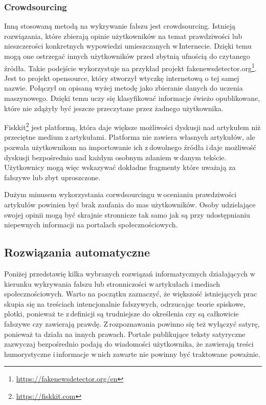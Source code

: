 \subsubsection{Crowdsourcing}
Inną stosowaną metodą na wykrywanie fałszu jest crowdsourcing. Istnieją rozwiązania, które zbierają opinie użytkowników na temat prawdziwości lub nieszczerości konkretnych wypowiedzi umieszczanych w\,Internecie. Dzięki temu mogą one ostrzegać innych użytkowników przed zbytnią ufnością do czytanego źródła. Takie podejście wykorzystuje na przykład projekt fakenewsdetector.org\footnote{\url{https://fakenewsdetector.org/en}}. Jest to projekt opensource, który stworzył wtyczkę internetową o tej samej nazwie. Połączył on opisaną wyżej metodę jako zbieranie danych do uczenia maszynowego. Dzięki temu uczy się klasyfikować informacje świeżo opublikowane, które nie zdążyły być jeszcze przeczytane przez żadnego użytkownika. 
\par Fiskkit\footnote{\url{https://fiskkit.com}} jest platformą, która daje większe możliwości dyskusji nad artykułem niż przeciętne medium z\,artykułami. Platforma nie zawiera własnych artykułów, ale pozwala użytkownikom na importowanie ich z\,dowolnego źródła i\,daje możliwość dyskusji bezpośrednio nad każdym osobnym zdaniem w\,danym tekście. Użytkownicy mogą więc wskazywać dokładne fragmenty które uważają za fałszywe lub zbyt uproszczone.
\par Dużym minusem wykorzystania corwdsourcingu w\,ocenianiu prawdziwości artykułów powinien być brak zaufania do mas użytkowników. Osoby udzielające swojej opinii mogą być skrajnie stronnicze tak samo jak są przy udostępnianiu niepewnych informacji na portalach społecznościowych.

\subsection{Rozwiązania automatyczne}
Poniżej przedstawię kilka wybranych rozwiązań informatycznych działających w\,kierunku wykrywania fałszu lub stronniczości w\,artykułach i\,mediach społecznościowych. 
Warto na początku zaznaczyć, że większość istniejących prac skupia się na treściach intencjonalnie fałszywych, odrzucając teorie spiskowe, plotki, ponieważ te z\,definicji są trudniejsze do określenia czy są całkowicie fałszywe czy zawierają prawdę. Z\,rozpoznawania powinno się też wyłączyć satyrę, ponieważ ta działa na innych prawach. Portale publikujące teksty satyryczne zazwyczaj bezpośrednio podają do wiadomości użytkownika, że zawierają treści humorystyczne i\,informacje w\,nich zawarte nie powinny być traktowane poważnie.


